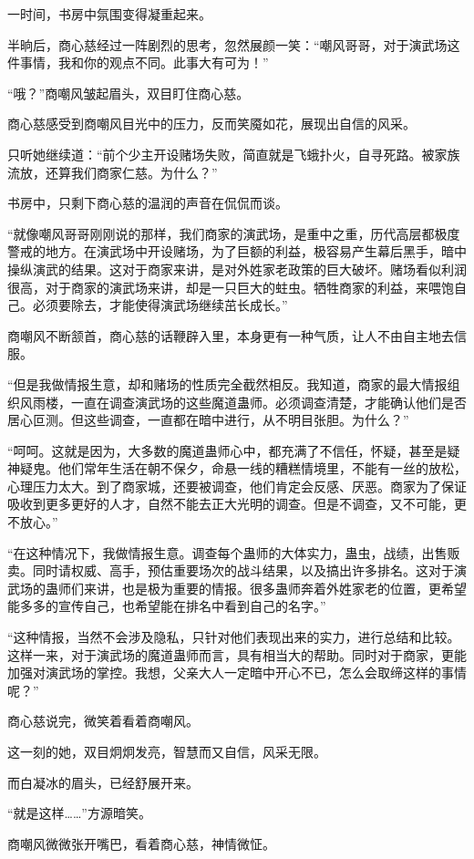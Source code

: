 \begin{this_body}
一时间，书房中氛围变得凝重起来。

半晌后，商心慈经过一阵剧烈的思考，忽然展颜一笑：“嘲风哥哥，对于演武场这件事情，我和你的观点不同。此事大有可为！”

“哦？”商嘲风皱起眉头，双目盯住商心慈。

商心慈感受到商嘲风目光中的压力，反而笑魇如花，展现出自信的风采。

只听她继续道：“前个少主开设赌场失败，简直就是飞蛾扑火，自寻死路。被家族流放，还算我们商家仁慈。为什么？”

书房中，只剩下商心慈的温润的声音在侃侃而谈。

“就像嘲风哥哥刚刚说的那样，我们商家的演武场，是重中之重，历代高层都极度警戒的地方。在演武场中开设赌场，为了巨额的利益，极容易产生幕后黑手，暗中操纵演武的结果。这对于商家来讲，是对外姓家老政策的巨大破坏。赌场看似利润很高，对于商家的演武场来讲，却是一只巨大的蛀虫。牺牲商家的利益，来喂饱自己。必须要除去，才能使得演武场继续茁长成长。”

商嘲风不断颔首，商心慈的话鞭辟入里，本身更有一种气质，让人不由自主地去信服。

“但是我做情报生意，却和赌场的性质完全截然相反。我知道，商家的最大情报组织风雨楼，一直在调查演武场的这些魔道蛊师。必须调查清楚，才能确认他们是否居心叵测。但这些调查，一直都在暗中进行，从不明目张胆。为什么？”

“呵呵。这就是因为，大多数的魔道蛊师心中，都充满了不信任，怀疑，甚至是疑神疑鬼。他们常年生活在朝不保夕，命悬一线的糟糕情境里，不能有一丝的放松，心理压力太大。到了商家城，还要被调查，他们肯定会反感、厌恶。商家为了保证吸收到更多更好的人才，自然不能去正大光明的调查。但是不调查，又不可能，更不放心。”

“在这种情况下，我做情报生意。调查每个蛊师的大体实力，蛊虫，战绩，出售贩卖。同时请权威、高手，预估重要场次的战斗结果，以及搞出许多排名。这对于演武场的蛊师们来讲，也是极为重要的情报。很多蛊师奔着外姓家老的位置，更希望能多多的宣传自己，也希望能在排名中看到自己的名字。”

“这种情报，当然不会涉及隐私，只针对他们表现出来的实力，进行总结和比较。这样一来，对于演武场的魔道蛊师而言，具有相当大的帮助。同时对于商家，更能加强对演武场的掌控。我想，父亲大人一定暗中开心不已，怎么会取缔这样的事情呢？”

商心慈说完，微笑着看着商嘲风。

这一刻的她，双目炯炯发亮，智慧而又自信，风采无限。

而白凝冰的眉头，已经舒展开来。

“就是这样……”方源暗笑。

商嘲风微微张开嘴巴，看着商心慈，神情微怔。


\end{this_body}
